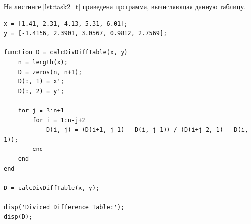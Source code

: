 \begin{table}[H]
    \centering
    \caption{Таблица разделённых разностей}
    \label{table:diff}
\end{table}

На листинге \ref{lst:task2_t} приведена программа, вычисляющая данную таблицу.

\begin{listing}[H]
\caption{Вычисление таблицы разделённых разностей}
\vspace{-20pt}
\label{lst:task2_t}
\begin{verbatim}
x = [1.41, 2.31, 4.13, 5.31, 6.01];
y = [-1.4156, 2.3901, 3.0567, 0.9812, 2.7569];

function D = calcDivDiffTable(x, y)
    n = length(x);
    D = zeros(n, n+1);
    D(:, 1) = x';
    D(:, 2) = y';

    for j = 3:n+1
        for i = 1:n-j+2
            D(i, j) = (D(i+1, j-1) - D(i, j-1)) / (D(i+j-2, 1) - D(i, 1));
        end
    end
end

D = calcDivDiffTable(x, y);

disp('Divided Difference Table:');
disp(D);
\end{verbatim}
\end{listing}

